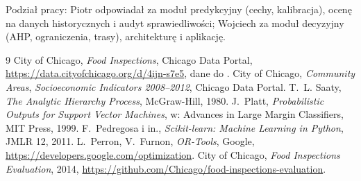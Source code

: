 \documentclass[11pt,a4paper]{article}
\begin{document}
Podział pracy: Piotr odpowiadał za moduł predykcyjny (cechy, kalibracja), ocenę na danych
historycznych i audyt sprawiedliwości; Wojciech za moduł decyzyjny (AHP, ograniczenia, trasy),
architekturę i aplikację.

\begingroup\small\raggedright
\begin{thebibliography}{9}
 City of Chicago, \textit{Food Inspections}, Chicago Data Portal,
  \url{https://data.cityofchicago.org/d/4ijn-s7e5}, dane do \DataUntil.
 City of Chicago, \textit{Community Areas}, \textit{Socioeconomic Indicators
  2008--2012}, Chicago Data Portal.
 T.~L. Saaty, \textit{The Analytic Hierarchy Process}, McGraw-Hill, 1980.
 J.~Platt, \textit{Probabilistic Outputs for Support Vector Machines}, w: Advances in
  Large Margin Classifiers, MIT Press, 1999.
 F.~Pedregosa i in., \textit{Scikit-learn: Machine Learning in Python}, JMLR 12, 2011.
 L.~Perron, V.~Furnon, \textit{OR-Tools}, Google,
  \url{https://developers.google.com/optimization}.
 City of Chicago, \textit{Food Inspections Evaluation}, 2014,
  \url{https://github.com/Chicago/food-inspections-evaluation}.
\end{thebibliography}
\endgroup
\end{document}
